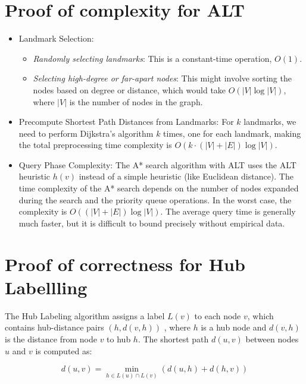 \begin{appendices}
\section{Proof of complexity for ALT}\label{appendix:ALT:complexity}
	\begin{itemize}
		\item Landmark Selection:
			\begin{itemize}
				\item \textit{Randomly selecting landmarks}: This is a constant-time operation, $ O(1) $.
				\item \textit{Selecting high-degree or far-apart nodes}: This might involve sorting the nodes based on degree or distance, which would take $ O(|V| \log |V|) $, where $ |V| $ is the number of nodes in the graph.
			\end{itemize}
		\item Precompute Shortest Path Distances from Landmarks: For $k$ landmarks, we need to perform Dijkstra’s algorithm $k$ times, one for each landmark, making the total preprocessing time complexity is $O(k \cdot (|V| + |E|) \log |V|)$.
		\item Query Phase Complexity: The A* search algorithm with ALT uses the ALT heuristic $ h(v) $ instead of a simple heuristic (like Euclidean distance). The time complexity of the A* search depends on the number of nodes expanded during the search and the priority queue operations. In the worst case, the complexity is $ O((|V| + |E|) \log |V|) $. The average query time is generally much faster, but it is difficult to bound precisely without empirical data.		
	\end{itemize}

\section{Proof of correctness for Hub Labellling}\label{appendix:Hub Labelling:correctness}

	The Hub Labeling algorithm assigns a label $ L(v) $ to each node $ v $, which contains hub-distance pairs $ (h, d(v, h)) $ , where $ h $ is a hub node and $ d(v, h) $ is the distance from node $ v $ to hub $ h $. The shortest path $ d(u, v) $ between nodes $ u $ and $ v $ is computed as:

	\begin{equation}
		d(u, v) = \min_{h \in \textit{L}(u) \cap \textit{L}(v)} \left( d(u, h) + d(h, v) \right)
	\end{equation}
	

\end{appendices}
